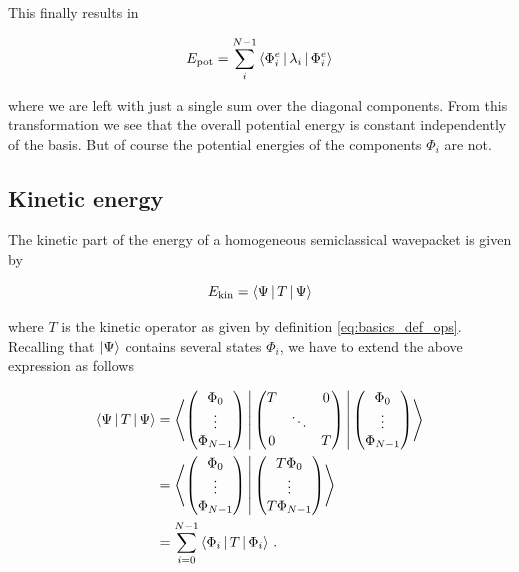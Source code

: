This finally results in

\begin{equation} \label{eq:potential_energy_eigen_homog}
  E_{\text{pot}} = \sum_i^{N-1} \Braket{ \Phi_i^e | \lambda_i | \Phi_i^e }
\end{equation}

where we are left with just a single sum over the diagonal components. From this
transformation we see that the overall potential energy is constant independently
of the basis. But of course the potential energies of the components $\Phi_i$ are
not.

\subsection{Kinetic energy}

The kinetic part of the energy of a homogeneous semiclassical wavepacket is given by

\begin{equation} \label{eq:hagedorn_kinetic}
  E_{\text{kin}} = \Braket{\Psi | T | \Psi}
\end{equation}

where $T$ is the kinetic operator as given by definition \eqref{eq:basics_def_ops}.
Recalling that $\Ket{\Psi}$ contains several states $\Phi_i$, we have to extend
the above expression as follows

\begin{align} \label{eq:hagedorn_kinetic_multi}
  \Braket{\Psi | T | \Psi} & = \Braket{ \begin{pmatrix} \Phi_0 \\ \vdots \\ \Phi_{N-1} \end{pmatrix}
                                      | \begin{pmatrix} T & {} & 0 \\ {} & \ddots & {} \\ 0 & {} & T \end{pmatrix}
                                      | \begin{pmatrix} \Phi_0 \\ \vdots \\ \Phi_{N-1} \end{pmatrix}
                                      } \nonumber \\
                           & = \Braket{ \begin{pmatrix} \Phi_0 \\ \vdots \\ \Phi_{N-1} \end{pmatrix}
                                      | \begin{pmatrix} T \Phi_0 \\ \vdots \\ T \Phi_{N-1} \end{pmatrix}
                                      } \nonumber \\
                           & = \sum_{i=0}^{N-1} \Braket{\Phi_i | T | \Phi_i} \,.
\end{align}


